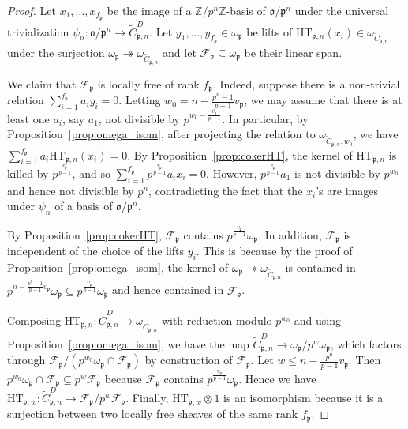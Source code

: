 \documentclass[10pt,a4paper]{amsart}
\newcommand{\HT}{\mathrm{HT}}
\newcommand{\ZZ}{{\mathbb Z}}
\newcommand{\cF}{{\mathcal F}}
\newcommand{\frako}{\mathfrak o}
\newcommand{\frakp}{\mathfrak p}
\begin{document}
\begin{proof} Let  $x_1,\ldots, x_{f_{\frakp}}$ be the image of a $\ZZ/p^n\ZZ$-basis of $\frako/\frakp^n$ 
under the universal trivialization $\psi_n\colon \frako/\frakp^n \rightarrow \widetilde{C}_{\frakp,n}^{D}$.
Let $y_1,\ldots, y_{f_\frakp}\in\omega_\frakp$ be lifts of $\HT_{\frakp,n}(x_i)\in \omega_{\widetilde{C}_{\frakp,n}}$ under the surjection $\omega_\frakp\twoheadrightarrow \omega_{\widetilde{C}_{\frakp,n}}$ and let $\cF_\frakp\subseteq \omega_\frakp$ be their linear span. 

We claim that $\cF_\frakp$ is locally free of rank $f_\frakp$. 
Indeed, suppose there is a non-trivial relation $\sum_{i=1}^{f_\frakp} a_i y_i = 0$.
Letting $w_0=n-\frac{p^n-1}{p-1}v_\frakp$, we may assume that there is at least one $a_i$, say $a_1$, not divisible by $p^{w_0-\frac{v_\frakp}{p-1}}$.
In particular, by Proposition~\ref{prop:omega_isom}, after projecting the relation to $\omega_{\widetilde{C}_{\frakp,n},w_0}$, we have $\sum_{i=1}^{f_\frakp} a_i \HT_{\frakp,n}(x_i) = 0$.
By Proposition~\ref{prop:cokerHT}, the kernel of $\HT_{\frakp,n}$ is killed by $p^{\frac{v_\frakp}{p-1}}$, and so $\sum_{i=1}^{f_\frakp} p^{\frac{v_\frakp}{p-1}}a_i x_i=0$. 
However, $p^{\frac{v_\frakp}{p-1}}a_1$ is not divisible by $p^{w_0}$ and hence not divisible by $p^n$, contradicting the fact that the $x_i$'s are images under $\psi_n$ of a basis of $\frako/\frakp^n$.

By Proposition~\ref{prop:cokerHT}, $\cF_\frakp$ contains $p^{\frac{v_\frakp}{p-1}}\omega_\frakp$.
In addition, $\cF_\frakp$ is independent of the choice of the lifts $y_i$.
This is because by the proof of Proposition~\ref{prop:omega_isom}, the kernel of $\omega_\frakp\twoheadrightarrow \omega_{\widetilde{C}_{\frakp.n}}$ is contained in $p^{n-\frac{p^n-1}{p-1}v_\frakp}\omega_\frakp\subseteq p^{\frac{v_\frakp}{p-1}}\omega_\frakp$ and hence contained in $\cF_\frakp$.

Composing $\HT_{\frakp,n}\colon \widetilde{C}_{\frakp,n}^{D} \rightarrow \omega_{\widetilde{C}_{\frakp,n}}$ with reduction modulo $p^{w_0}$ and using Proposition~\ref{prop:omega_isom}, we have the map $\widetilde{C}_{\frakp,n}^{D} \rightarrow \omega_{\frakp}/p^w\omega_\frakp$, which factors through $\cF_\frakp/(p^{w_0}\omega_\frakp \cap \cF_\frakp)$ by construction of $\cF_\frakp$.
Let $w\leqslant n-\frac{p^n}{p-1}v_\frakp$.
Then $p^{w_0}\omega_\frakp \cap \cF_\frakp \subseteq p^w \cF_\frakp$ because $\cF_\frakp$ contains $p^{\frac{v_\frakp}{p-1}}\omega_\frakp$.
Hence we have $\HT_{\frakp,w}\colon \widetilde{C}_{\frakp,n}^{D} \rightarrow \cF_{\frakp}/p^w \cF_{\frakp}$.
Finally, $\HT_{\frakp,w}\otimes 1$ is an isomorphism because it is a surjection between two locally free sheaves of the same rank $f_\frakp$.\end{proof}
\end{document}
